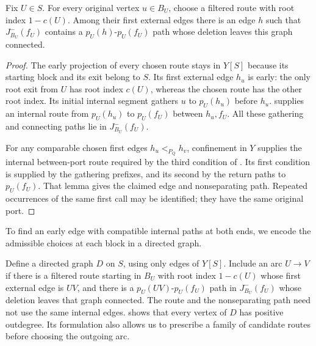 \documentclass[USenglish, a4paper, thm-restate,numberwithinsect, cleveref]{lipics-v2021}
\begin{document}
\begin{lemma}\label{lem:characterization-safe-first-edges}
Fix $U\in S$. For every original vertex $u\in B_U$, choose a
filtered route with root index $1-c(U)$. Among their first external edges
there is an edge $h$ such that $J_{B_U}^-(f_U)$ contains a
$p_U(h)$-$p_U(f_U)$ path whose deletion leaves this graph connected.
\end{lemma}
\begin{proof}
The early projection of every chosen route stays in $Y[S]$ because
its starting block and its exit belong to $S$. Its first external
edge $h_u$ is early: the only root exit from $U$ has root index $c(U)$,
whereas the chosen route has the other root index. Its initial internal
segment gathers $u$ to $p_U(h_u)$ before $h_u$.
 supplies an internal route from
$p_U(h_u)$ to $p_U(f_U)$ between $h_u,f_U$. All these gathering and
connecting paths lie in $J_{B_U}^-(f_U)$.

For any comparable chosen first edges $h_u<_{P_Q}h_v$, confinement
in $Y$ supplies the internal between-port route required by the
third condition of . Its first
condition is supplied by the gathering prefixes, and its second by
the return paths to $p_U(f_U)$. That lemma gives the claimed edge
and nonseparating path. Repeated occurrences of the same first call
may be identified; they have the same original port.
\end{proof}

To find an early edge with compatible internal paths at both ends,
we encode the admissible choices at each block in a directed graph.

Define a directed graph $D$ on $S$, using only edges of $Y[S]$.
Include an arc $U\to V$ if there is a filtered route starting in
$B_U$ with root index $1-c(U)$ whose first external edge is $UV$, and
there is a
$p_U(UV)$-$p_U(f_U)$ path in $J_{B_U}^-(f_U)$ whose deletion
leaves that graph connected. The route and the nonseparating path
need not use the same internal edges.
 shows that every vertex of $D$ has
positive outdegree. Its formulation also allows us to prescribe a
family of candidate routes before choosing the outgoing arc.
\end{document}
